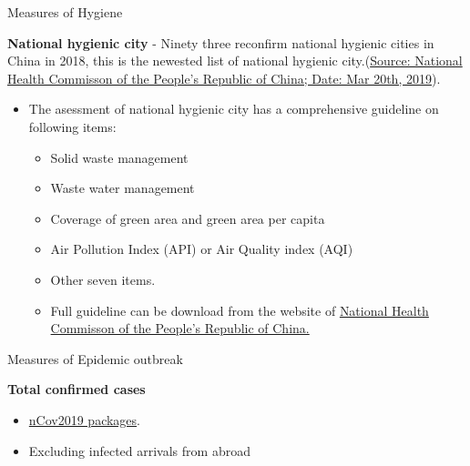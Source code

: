 \documentclass[10pt,ignorenonframetext,aspectratio=169,notes=hide,]{beamer}
\providecommand{\tightlist}{%
  \setlength{\itemsep}{0pt}\setlength{\parskip}{0pt}}
\begin{document}
\begin{frame}{Measures of Hygiene}
\protect\hypertarget{measures-of-hygiene}{}

\textbf{National hygienic city}
- Ninety three reconfirm national hygienic cities in China in 2018, this is the newested list of national hygienic city.(\href{http://www.chinanews.com/gn/2019/03-20/8785718.shtml}{Source: National Health Commisson of the People's Republic of China; Date: Mar 20th, 2019}).

\begin{itemize}
\item
  The asessment of national hygienic city has a comprehensive guideline on following items:

  \begin{itemize}
  \tightlist
  \item
    Solid waste management
  \item
    Waste water management
  \item
    Coverage of green area and green area per capita
  \item
    Air Pollution Index (API) or Air Quality index (AQI)
  \item
    Other seven items.
  \item
    Full guideline can be download from the website of \href{http://www.nhc.gov.cn/jkj/s5898/201509/a758669061fd469aa3a754c8781acae4.shtml}{National Health Commisson of the People's Republic of China.}
  \end{itemize}
\end{itemize}

\end{frame}

\begin{frame}{Measures of Epidemic outbreak}
\protect\hypertarget{measures-of-epidemic-outbreak}{}

\textbf{Total confirmed cases}

\begin{itemize}
\item
  \href{https://github.com/GuangchuangYu/nCov2019}{nCov2019 packages}.
\item
  Excluding infected arrivals from abroad
\end{itemize}

\end{frame}
\end{document}
